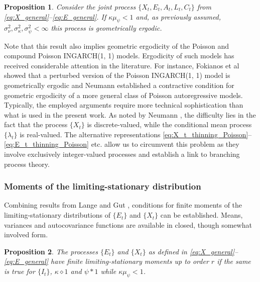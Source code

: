 \documentclass{article}
\newtheorem{proposition}{Proposition}
\begin{document}
\begin{proposition}
Consider the joint process $\{X_t, E_t, A_t, L_t, C_t\}$ from \eqref{eq:X_general}--\eqref{eq:E_general}. If $\kappa\mu_\psi < 1$ and, as previously assumed, $\sigma^2_\nu, \sigma^2_\kappa, \sigma^2_\psi < \infty$ this process is geometrically ergodic.
\end{proposition}
Note that this result also implies geometric ergodicity of the Poisson and compound Poisson INGARCH(1, 1) models. Ergodicity of such models has received considerable attention in the literature. For instance, Fokianos et al \cite{Fokianos2009} showed that a perturbed version of the Poisson INGARCH(1, 1) model is geometrically ergodic and Neumann \cite[Theorem 3.1]{Neumann2011} established a contractive condition for geometric ergodicity of a more general class of Poisson autoregressive models. Typically, the employed arguments require more technical sophistication than what is used in the present work. As noted by Neumann \cite{Neumann2011}, the difficulty lies in the fact that the process $\{X_t\}$ is discrete-valued, while the conditional mean process $\{\lambda_t\}$ is real-valued. The alternative representations \eqref{eq:X_t_thinning_Poisson}--\eqref{eq:E_t_thinning_Poisson} etc. allow us to circumvent this problem as they involve exclusively integer-valued processes and establish a link to branching process theory.

\subsubsection{Moments of the limiting-stationary distribution}
\label{subsec:moments_general}

Combining results from Lange \cite[Sec. 4]{Lange1981} and Gut \cite[Theorem 5.2]{Gut2009}, conditions for finite moments of the limiting-stationary distributions of $\{E_t\}$ and $\{X_t\}$ can be established. Means, variances and autocovariance functions are available in closed, though somewhat involved form. 

\begin{proposition}
The processes $\{E_t\}$ and $\{X_t\}$  as defined in \eqref{eq:X_general}--\eqref{eq:E_general} have finite limiting-stationary moments up to order $r$ if the same is true for $\{I_t\}$, $\kappa \diamond 1$ and $\psi * 1$ while $\kappa\mu_\psi < 1$.
\end{proposition}
\end{document}

